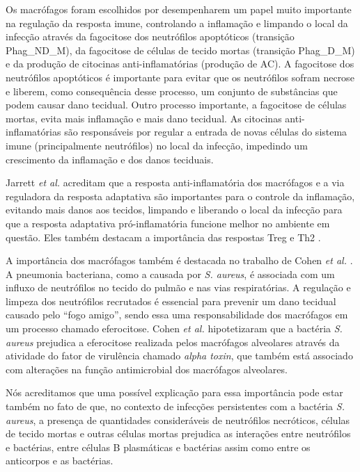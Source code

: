 \documentclass[a4paper,10pt]{article}
\begin{document}
		Os macrófagos foram escolhidos por desempenharem um papel muito importante na regulação da resposta imune, 
		controlando a inflamação e limpando o local da infecção através da fagocitose dos neutrófilos apoptóticos (transição Phag\_ND\_M), 
		da fagocitose de células de tecido mortas (transição Phag\_D\_M) e da produção de citocinas anti-inflamatórias (produção de AC). 
		A fagocitose dos neutrófilos apoptóticos é importante para evitar que os neutrófilos sofram necrose e liberem, como consequência desse processo, 
		um conjunto de substâncias que podem causar dano tecidual. Outro processo importante, a fagocitose de células mortas, evita mais inflamação e 
		mais dano tecidual. As citocinas anti-inflamatórias são responsáveis por regular a entrada de novas células do sistema imune (principalmente 
		neutrófilos) no local da infecção, impedindo um crescimento da inflamação e dos danos teciduais.
		
		Jarrett \textit{et al.} \cite{Jarrett2015} acreditam que a resposta anti-inflamatória dos macrófagos e a via reguladora 
		da resposta adaptativa são importantes para o controle da inflamação, evitando mais danos aos tecidos, limpando e 
		liberando o local da infecção para que a resposta adaptativa pró-inflamatória funcione melhor no ambiente 
		em questão. Eles também destacam a importância das respostas Treg e Th2 \cite{Jarrett2015}. 
						
		A importância dos macrófagos também é destacada no trabalho de Cohen \textit{et al.} \cite{Cohen2016}. 
		A pneumonia bacteriana, como a causada por \textit{S. aureus}, é associada com um influxo de neutrófilos 
		no tecido do pulmão e nas vias respiratórias. A regulação e limpeza dos neutrófilos recrutados é essencial 
		para prevenir um dano tecidual causado pelo ``fogo amigo'', sendo essa uma responsabilidade dos macrófagos 
		em um processo chamado eferocitose. Cohen \textit{et al.} \cite{Cohen2016} hipotetizaram que a bactéria \textit{S. aureus} 
		prejudica a eferocitose realizada pelos macrófagos alveolares através da atividade do fator de 
		virulência chamado \textit{alpha toxin}, que também está associado com alterações na função antimicrobial 
		dos macrófagos alveolares.
		
		Nós acreditamos que uma possível explicação para essa importância pode estar também no fato de que, 
		no contexto de infecções persistentes com a bactéria \textit{S. aureus}, a presença de 
		quantidades consideráveis de neutrófilos necróticos, células de tecido mortas e outras células mortas 
		prejudica as interações entre neutrófilos e bactérias, entre células B plasmáticas e bactérias 
		assim como entre os anticorpos e as bactérias. 
		
\end{document}
